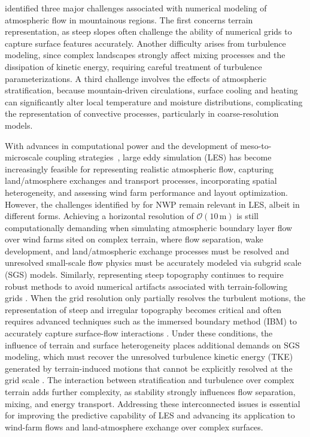 \documentclass[%
superscriptaddress,
 amsmath,amssymb,
pra,
showkeys,
]{revtex4-2}
\begin{document}
\citet{chow2019crossing} identified three major challenges associated with numerical modeling of atmospheric flow in mountainous regions. The first concerns terrain representation, as steep slopes often challenge the ability of numerical grids to capture surface features accurately. Another difficulty arises from turbulence modeling, since complex landscapes strongly affect mixing processes and the dissipation of kinetic energy, requiring careful treatment of turbulence parameterizations. A third challenge involves the effects of atmospheric stratification, because mountain-driven circulations, surface cooling and heating can significantly alter local temperature and moisture distributions, complicating the representation of convective processes, particularly in coarse-resolution models.

With advances in computational power and the development of meso-to-microscale coupling strategies~\citep{allaerts2020development,Ajay2025ProfileAssimilation}, large eddy simulation (LES) has become increasingly feasible for representing realistic atmospheric flow, capturing land/atmosphere exchanges and transport processes, incorporating spatial heterogeneity, and assessing wind farm performance and layout optimization. However, the challenges identified by \citet{chow2019crossing} for NWP remain relevant in LES, albeit in different forms. Achieving a horizontal resolution of $\mathcal{O}(10\,\mathrm{m})$ is still computationally demanding when simulating atmospheric boundary layer flow over wind farms sited on complex terrain, where flow separation, wake development, and land/atmospheric exchange processes must be resolved and unresolved small-scale flow physics must be accurately modeled via subgrid scale (SGS) models. Similarly, representing steep topography continues to require robust methods to avoid numerical artifacts associated with terrain-following grids \cite{lundquist2012immersed,bhuiyan2022scale,chow2019crossing}.  
When the grid resolution only partially resolves the turbulent motions, the representation of steep and irregular topography becomes critical and often requires advanced techniques such as the immersed boundary method (IBM) to accurately capture surface-flow interactions \cite{lundquist2012immersed,bao2018large,giani2024sensitivity}. Under these conditions, the influence of terrain and surface heterogeneity places additional demands on SGS modeling, which must recover the unresolved turbulence kinetic energy (TKE) generated by terrain-induced motions that cannot be explicitly resolved at the grid scale \cite{bhuiyan2022scale,singh2024impact}. The interaction between stratification and turbulence over complex terrain adds further complexity, as stability strongly influences flow separation, mixing, and energy transport. Addressing these interconnected issues is essential for improving the predictive capability of LES and advancing its application to wind-farm flows and land-atmosphere exchange over complex surfaces. 
\end{document}
